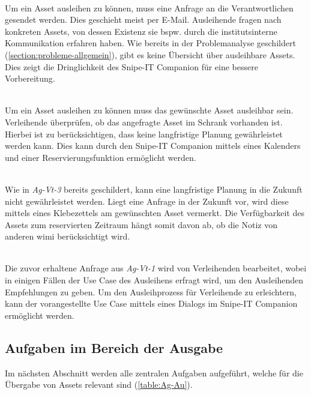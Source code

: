 {\sffamily\color{maincolor}{Ag-Vt-1 | Abfragen der Assets/Verfügbarkeit}}\\
Um ein Asset ausleihen zu können, muss eine Anfrage an die Verantwortlichen
gesendet werden. Dies geschieht meist per E-Mail. Ausleihende fragen nach
konkreten Assets, von dessen Existenz sie bspw. durch die institutsinterne
Kommunikation erfahren haben. Wie bereits in der Problemanalyse geschildert
(\ref{section:probleme-allgemein}), gibt es keine Übersicht über ausleihbare
Assets. Dies zeigt die Dringlichkeit des Snipe-IT Companion für eine bessere
Vorbereitung.

        {\sffamily\color{maincolor}{Ag-Vt-2 | Einsehen der Verfügbarkeit}}\\
Um ein Asset ausleihen zu können muss das gewünschte Asset ausleihbar sein.
Verleihende überprüfen, ob das angefragte Asset im Schrank vorhanden ist.
Hierbei ist zu berücksichtigen, dass keine langfristige Planung gewährleistet
werden kann. Dies kann durch den Snipe-IT Companion mittels eines Kalenders und
einer Reservierungsfunktion ermöglicht werden.

        {\sffamily\color{maincolor}{Ag-Vt-3 | Reservierung der Assets}}\\
Wie in \textit{Ag-Vt-3} bereits geschildert, kann eine langfristige Planung in
die Zukunft nicht gewährleistet werden. Liegt eine Anfrage in der Zukunft vor,
wird diese mittels eines Klebezettels am gewünschten Asset vermerkt. Die
Verfügbarkeit des Assets zum reservierten Zeitraum hängt somit davon ab, ob die
Notiz von anderen \ac{wimi} berücksichtigt wird.

        {\sffamily\color{maincolor}{Ag-Vt-4 | Beratung der Ausleihenden}}\\
Die zuvor erhaltene Anfrage aus \textit{Ag-Vt-1} wird von Verleihenden
bearbeitet, wobei in einigen Fällen der Use Case des Ausleihens erfragt wird, um
den Ausleihenden Empfehlungen zu geben. Um den Ausleihprozess für Verleihende zu
erleichtern, kann der vorangestellte Use Case mittels eines Dialogs im Snipe-IT
Companion ermöglicht werden.


\subsection{Aufgaben im Bereich der Ausgabe}
Im nächsten Abschnitt werden alle zentralen Aufgaben aufgeführt, welche für die
Übergabe von Assets relevant sind (\ref{table:Ag-Au}).

